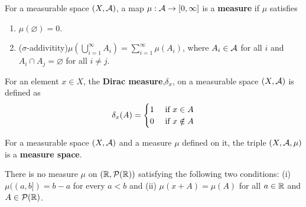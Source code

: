 \documentclass[11pt]{article}
\numberwithin{equation}{section}
\newcommand{\s}[0]{$\sigma$}
\begin{document}
	\begin{definition}
		For a measurable space $(X, \mathcal{{A}})$, a map $\mu:\mathcal{{A}} \to [0, \infty]$ is a \textbf{measure} if $\mu$ satisfies
		\begin{enumerate}
			\item $\mu(\varnothing) = 0$.
			\item (\s-addivitity)$\mu\left(\bigcup_{i=1}^\infty A_i\right) = \sum_{i=1}^\infty \mu(A_i)$, where $A_i \in \mathcal{{A}}$ for all $i$ and $A_i \cap A_j = \varnothing$ for all $i \neq j$.
		\end{enumerate}
	\end{definition}
	
	\begin{example}
		For an element $x \in X$, the \textbf{Dirac measure},$\delta_x$, on a measurable space $(X, \mathcal{{A}})$ is defined as
		\begin{align}
			\delta_x(A) = \begin{cases}
				1 &\text{{ if }} x \in A \\
				0 &\text{{ if }} x \notin A
			\end{cases}
		\end{align}
	\end{example}
	
	\begin{definition}
		For a measurable space $(X, \mathcal{{A}})$ and a measure $\mu$ defined on it, the triple $(X, \mathcal{{A}}, \mu)$ is a \textbf{measure space}.
	\end{definition}
	
	\begin{theorem} \label{thm:nomeasure}
		There is no measure $\mu$ on $(\mathbb{R}, \mathcal{{P}}(\mathbb{R}))$ satisfying the following two conditions: (i) $\mu((a, b]) = b-a$ for every $a < b$ and (ii) $\mu(x+A) = \mu(A)$ for all $a \in \mathbb{R}$ and $A \in \mathcal{{P}}(\mathbb{R})$. 
	\end{theorem}
	
\end{document}
